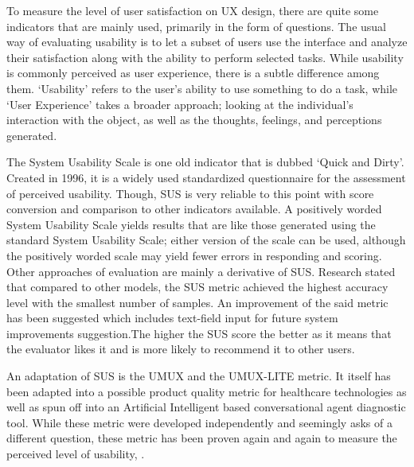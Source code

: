 \documentclass[
  11pt, %
]{assignment}
\begin{document}
To measure the level of user satisfaction on UX design, there are quite some indicators that are mainly used, primarily in the form of questions. The usual way of evaluating usability is to let a subset of users use the interface and analyze their satisfaction along with the ability to perform selected tasks\autocite{Pastushenko}. While usability is commonly perceived as user experience, there is a subtle difference among them. `Usability' refers to the user's ability to use something to do a task, while `User Experience' takes a broader approach; looking at the individual's interaction with the object, as well as the thoughts, feelings, and perceptions generated\autocite{Erlinda}.

The System Usability Scale is one old indicator that is dubbed `Quick and Dirty'\autocite{Khalid}. Created in 1996, it is a widely used standardized questionnaire for the assessment of perceived usability\autocite{Lewis}. Though, SUS is very reliable to this point with score conversion and comparison to other indicators available\autocite{Lewis2018MeasuringPU, Lewis2018ItemBF}. A positively worded System Usability Scale yields results that are like those generated using the standard System Usability Scale\autocite{Kortum2021IsIT}; either version of the scale can be used, although the positively worded scale may yield fewer errors in responding and scoring\autocite{Kortum2021IsIT}. Other approaches of evaluation are mainly a derivative of SUS. Research stated that compared to other models, the SUS metric achieved the highest accuracy level with the smallest number of samples\autocite{Souza2019UserEE}. An improvement of the said metric has been suggested which includes text-field input for future system improvements suggestion\autocite{Harper2021APS}.The higher the SUS score the better as it means that the evaluator likes it and is more likely to recommend it to other users\autocite{Indriana2017UIUXA, Drew}.

An adaptation of SUS is the UMUX and the UMUX-LITE metric. It itself has been adapted into a possible product quality metric for healthcare technologies\autocite{Borsci2019IsTL} as well as spun off into an Artificial Intelligent based conversational agent diagnostic tool\autocite{Borsci2022TheCU}. While these metric were developed independently and seemingly asks of a different question, these metric has been proven again and again to measure the perceived level of usability\autocite{Lewis2018MeasuringPU}, \autocite{Berkman2016ReassessingTU, Lewis2019MeasuringPU}.
\end{document}
